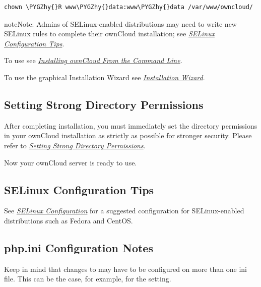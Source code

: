 \documentclass[letterpaper,10pt,english]{sphinxmanual}
\def\PYGZhy{\char`\-}
\begin{document}
\begin{Verbatim}[commandchars=\\\{\}]
chown \PYGZhy{}R www\PYGZhy{}data:www\PYGZhy{}data /var/www/owncloud/
\end{Verbatim}

\begin{notice}{note}{Note:}
Admins of SELinux-enabled distributions may need to write new SELinux
rules to complete their ownCloud installation; see
{\hyperref[installation/source_installation:selinux\string-tips\string-label]{\emph{SELinux Configuration Tips}}}.
\end{notice}

To use  see {\hyperref[installation/command_line_installation::doc]{\emph{\emph{Installing ownCloud From the Command Line}}}}.

To use the graphical Installation Wizard see {\hyperref[installation/installation_wizard::doc]{\emph{\emph{Installation Wizard}}}}.


\subsection{Setting Strong Directory Permissions}
\label{installation/source_installation:setting-strong-directory-permissions}
After completing installation, you must immediately set the directory
permissions in your ownCloud installation as strictly as possible for stronger
security. Please refer to {\hyperref[installation/installation_wizard:strong\string-perms\string-label]{\emph{Setting Strong Directory Permissions}}}.

Now your ownCloud server is ready to use.


\subsection{SELinux Configuration Tips}
\label{installation/source_installation:selinux-configuration-tips}\label{installation/source_installation:selinux-tips-label}
See {\hyperref[installation/selinux_configuration::doc]{\emph{\emph{SELinux Configuration}}}} for a suggested configuration for
SELinux-enabled distributions such as Fedora and CentOS.


\subsection{php.ini Configuration Notes}
\label{installation/source_installation:php-ini-configuration-notes}\label{installation/source_installation:php-ini-tips-label}
Keep in mind that changes to  may have to be configured on more than one
ini file. This can be the case, for example, for the  setting.
\end{document}
